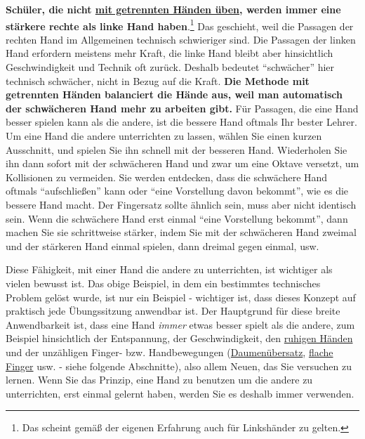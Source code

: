 \textbf{Schüler, die nicht \hyperref[c1ii7]{mit getrennten Händen üben}, werden immer eine stärkere rechte als linke Hand haben}.\footnote{Das scheint gemäß der eigenen Erfahrung auch für Linkshänder zu gelten.}
Das geschieht, weil die Passagen der rechten Hand im Allgemeinen technisch schwieriger sind.
Die Passagen der linken Hand erfordern meistens mehr Kraft, die linke Hand bleibt aber hinsichtlich Geschwindigkeit und Technik oft zurück.
Deshalb bedeutet \enquote{schwächer} hier technisch schwächer, nicht in Bezug auf die Kraft.
\textbf{Die Methode mit getrennten Händen balanciert die Hände aus, weil man automatisch der schwächeren Hand mehr zu arbeiten gibt.}
Für Passagen, die eine Hand besser spielen kann als die andere, ist die bessere Hand oftmals Ihr bester Lehrer.
Um eine Hand die andere unterrichten zu lassen, wählen Sie einen kurzen Ausschnitt, und spielen Sie ihn schnell mit der besseren Hand.
Wiederholen Sie ihn dann sofort mit der schwächeren Hand und zwar um eine Oktave versetzt, um Kollisionen zu vermeiden.
Sie werden entdecken, dass die schwächere Hand oftmals \enquote{aufschließen} kann oder \enquote{eine Vorstellung davon bekommt}, wie es die bessere Hand macht.
Der Fingersatz sollte ähnlich sein, muss aber nicht identisch sein.
Wenn die schwächere Hand erst einmal \enquote{eine Vorstellung bekommt}, dann machen Sie sie schrittweise stärker, indem Sie mit der schwächeren Hand zweimal und der stärkeren Hand einmal spielen, dann dreimal gegen einmal, usw.

Diese Fähigkeit, mit einer Hand die andere zu unterrichten, ist wichtiger als vielen bewusst ist.
Das obige Beispiel, in dem ein bestimmtes technisches Problem gelöst wurde, ist nur ein Beispiel - wichtiger ist, dass dieses Konzept auf praktisch jede Übungssitzung anwendbar ist.
Der Hauptgrund für diese breite Anwendbarkeit ist, dass eine Hand \textit{immer} etwas besser spielt als die andere, zum Beispiel hinsichtlich der Entspannung, der Geschwindigkeit, den \hyperref[ruhig]{ruhigen Händen} und der unzähligen Finger- bzw. Handbewegungen (\hyperref[c1iii5a]{Daumenübersatz}, \hyperref[c1iii4b]{flache Finger} usw. - siehe folgende Abschnitte), also allem Neuen, das Sie versuchen zu lernen.
Wenn Sie das Prinzip, eine Hand zu benutzen um die andere zu unterrichten, erst einmal gelernt haben, werden Sie es deshalb immer verwenden.



